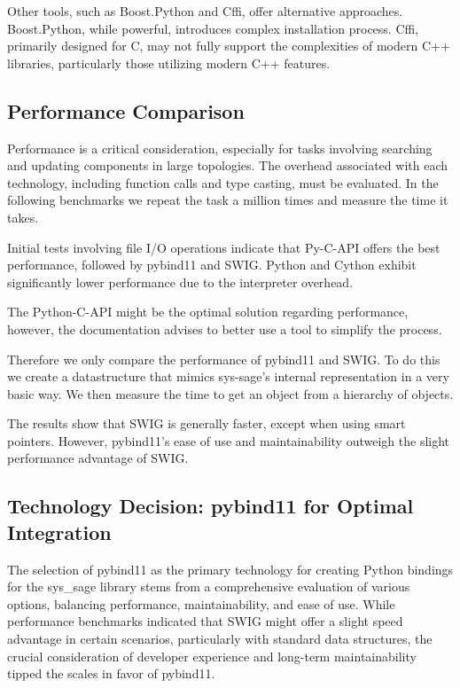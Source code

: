 Other tools, such as Boost.Python and Cffi, offer alternative approaches. Boost.Python, while powerful, introduces complex installation process. Cffi, primarily designed for C, may not fully support the complexities of modern C++ libraries, particularly those utilizing modern C++ features. \cite{boost-docu} \cite{cffi-docu}
\subsection{Performance Comparison}

Performance is a critical consideration, especially for tasks involving searching and updating components in large topologies. The overhead associated with each technology, including function calls and type casting, must be evaluated. In the following benchmarks we repeat the task a million times and measure the time it takes.

Initial tests involving file I/O operations indicate that Py-C-API offers the best performance, followed by pybind11 and SWIG. Python and Cython exhibit significantly lower performance due to the interpreter overhead.



The Python-C-API might be the optimal solution regarding performance, however, the documentation advises to better use a tool to simplify the process. \cite{py-c-api}

Therefore we only compare the performance of pybind11 and SWIG. To do this we create a datastructure that mimics sys-sage's internal representation in a very basic way. We then measure the time to get an object from a hierarchy of objects. 

The results show that SWIG is generally faster, except when using smart pointers. However, pybind11's ease of use and maintainability outweigh the slight performance advantage of SWIG.






\subsection{Technology Decision: pybind11 for Optimal Integration}

The selection of pybind11 as the primary technology for creating Python bindings for the sys\_sage library stems from a comprehensive evaluation of various options, balancing performance, maintainability, and ease of use. While performance benchmarks indicated that SWIG might offer a slight speed advantage in certain scenarios, particularly with standard data structures, the crucial consideration of developer experience and long-term maintainability tipped the scales in favor of pybind11.

